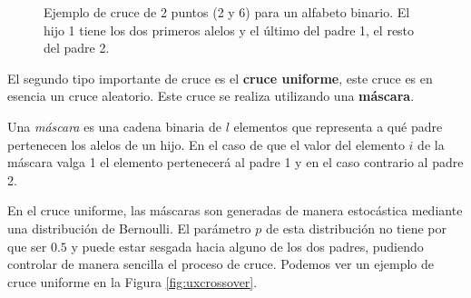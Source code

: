 \begin{figure}[t]
    \centering
    \caption{Ejemplo de cruce de 2 puntos (2 y 6) para un alfabeto binario. El hijo 1 tiene los dos primeros alelos y el último del padre 1, el resto del padre 2.}
    \label{fig:2xcrossover}
\end{figure}

El segundo tipo importante de cruce es el \textbf{cruce uniforme}, este cruce es en esencia un cruce aleatorio. Este cruce se realiza utilizando una \textbf{máscara}.
\begin{definition}\label{def:mascara}
    Una \textit{máscara} es una cadena binaria de $l$ elementos que representa a qué padre pertenecen los alelos de un hijo. En el caso de que el valor del elemento $i$ de la máscara valga 1 el elemento pertenecerá al padre 1 y en el caso contrario al padre 2.
\end{definition}
En el cruce uniforme, las máscaras son generadas de manera estocástica mediante una distribución de Bernoulli. El parámetro $p$ de esta distribución no tiene por que ser $0.5$ y puede estar sesgada hacia alguno de los dos padres, pudiendo controlar de manera sencilla el proceso de cruce. Podemos ver un ejemplo de cruce uniforme en la Figura \ref{fig:uxcrossover}.

